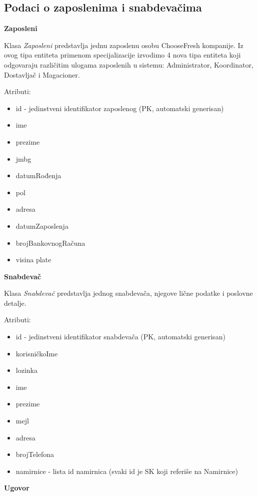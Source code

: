 
\subsection{Podaci o zaposlenima i snabdevačima}

\textbf{\large Zaposleni}
\vspace{0.3cm}

Klasa \textit{Zaposleni} predstavlja jednu zaposlenu osobu ChooseFresh kompanije. Iz ovog tipa entiteta primenom specijalizacije izvodimo 4 nova tipa entiteta koji odgovaraju različitim ulogama zaposlenih u sistemu: Administrator, Koordinator, Dostavljač i Magacioner.

Atributi:
\begin{itemize}
    \item id - jedinstveni identifikator zaposlenog (PK, automatski generisan)
    \item ime
    \item prezime
    \item jmbg
    \item datumRođenja
    \item pol
    \item adresa
    \item datumZaposlenja
    \item brojBankovnogRačuna
    \item visina plate
\end{itemize}

\textbf{\large Snabdevač}
\vspace{0.3cm}

Klasa \textit{Snabdevač} predstavlja jednog snabdevača, njegove lične podatke i poslovne detalje.

Atributi:
\begin{itemize}
    \item id - jedinstveni identifikator snabdevača (PK, automatski generisan)
    \item korisničkoIme
    \item lozinka
    \item ime
    \item prezime
    \item mejl
    \item adresa
    \item brojTelefona
    \item namirnice - lista id namirnica (svaki id je SK koji referiše na Namirnice)
\end{itemize}

\textbf{\large Ugovor}
\vspace{0.3cm}

